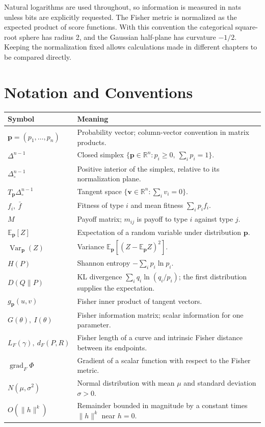 \documentclass[11pt,oneside,openany]{book}
\theoremstyle{definition}
\theoremstyle{remark}
\newcommand{\R}{\mathbb{R}}
\newcommand{\E}{\mathbb{E}}
\newcommand{\Var}{\operatorname{Var}}
\newcommand{\grad}{\operatorname{grad}}
\newcommand{\p}{\mathbf{p}}
\newcommand{\vvec}{\mathbf{v}}
\numberwithin{equation}{chapter}
\begin{document}
Natural logarithms are used throughout, so information is measured in nats unless bits are explicitly requested. The Fisher metric is normalized as the expected product of score functions. With this convention the categorical square-root sphere has radius 2, and the Gaussian half-plane has curvature $-1/2$. Keeping the normalization fixed allows calculations made in different chapters to be compared directly.

\tableofcontents
\chapter*{Notation and Conventions}
{\renewcommand{\arraystretch}{.88}
\begin{longtable}{@{}L{.27\textwidth}L{.67\textwidth}@{}}
\toprule
Symbol & Meaning\\\midrule\endhead
$\p=(p_1,\ldots,p_n)$ & Probability vector; column-vector convention in matrix products.\\[5pt]
$\Delta^{n-1}$ & Closed simplex $\{\p\in\R^n:p_i\geq0,\ \sum_i p_i=1\}$.\\[5pt]
$\Delta^{n-1}_{\!\circ}$ & Positive interior of the simplex, relative to its normalization plane.\\[5pt]
$T_\p\Delta^{n-1}_{\!\circ}$ & Tangent space $\{\vvec\in\R^n:\sum_i v_i=0\}$.\\[5pt]
$f_i,\ \bar f$ & Fitness of type $i$ and mean fitness $\sum_i p_i f_i$.\\[5pt]
$M$ & Payoff matrix; $m_{ij}$ is payoff to type $i$ against type $j$.\\[5pt]
$\E_\p[Z]$ & Expectation of a random variable under distribution $\p$.\\[5pt]
$\Var_\p(Z)$ & Variance $\E_\p[(Z-\E_\p Z)^2]$.\\[5pt]
$H(P)$ & Shannon entropy $-\sum_i p_i\ln p_i$.\\[5pt]
$D(Q\|P)$ & KL divergence $\sum_i q_i\ln(q_i/p_i)$; the first distribution supplies the expectation.\\[5pt]
$g_\p(u,v)$ & Fisher inner product of tangent vectors.\\[5pt]
$G(\theta),\ I(\theta)$ & Fisher information matrix; scalar information for one parameter.\\[5pt]
$L_F(\gamma),\ d_F(P,R)$ & Fisher length of a curve and intrinsic Fisher distance between its endpoints.\\[5pt]
$\grad_F\Phi$ & Gradient of a scalar function with respect to the Fisher metric.\\[5pt]
$N(\mu,\sigma^2)$ & Normal distribution with mean $\mu$ and standard deviation $\sigma>0$.\\[5pt]
$O(\|h\|^k)$ & Remainder bounded in magnitude by a constant times $\|h\|^k$ near $h=0$.\\
\bottomrule
\end{longtable}
}
\end{document}
